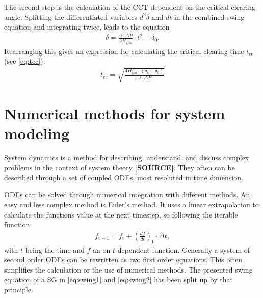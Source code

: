 The second step is the calculation of the \acs{CCT} dependent on the critical clearing angle. Splitting the differentiated variables $d^2\delta$ and $dt$ in the combined swing equation and integrating twice, leads to the equation
\begin{align}
        \delta=\frac{\omega \cdot \Delta P}{4 H_\mathrm{gen}} \cdot t^2 + \delta_\mathrm{0}. \nonumber
\end{align}
Rearranging this gives an expression for calculating the critical clearing time $t_\mathrm{cc}$ (see \autoref{eq:tcc}).
\begin{align}
        t_\mathrm{cc}=\sqrt{\frac{4 H_\mathrm{gen} \cdot (\delta_\mathrm{c}-\delta_\mathrm{0})}{\omega \cdot \Delta P}} \label{eq:tcc}
\end{align}

\section{Numerical methods for system modeling}

System dynamics is a method for describing, understand, and discuss complex problems in the context of system theory \textbf{[SOURCE]}. They often can be described through a set of coupled \acfp{ODE}, most resoluted in time dimension. 

\acsp{ODE} can be solved through numerical integration with different methods. An easy and less complex method is Euler's method. It uses a linear extrapolation to calculate the functions value at the next timestep, so following the iterable function
\begin{align}
        f_\mathrm{t+1}=f_\mathrm{t}+\left(\frac{df}{dt}\right)_\mathrm{t} \cdot \Delta t \label{eq:euler},
\end{align}
with $t$ being the time and $f$ an on $t$ dependent function. Generally a system of second order \acsp{ODE} can be rewritten as two first order equations. This often simplifies the calculation or the use of numerical methods. The presented swing equation of a \acs{SG} in \autoref{eq:swing1} and \autoref{eq:swing2} has been split up by that principle.

